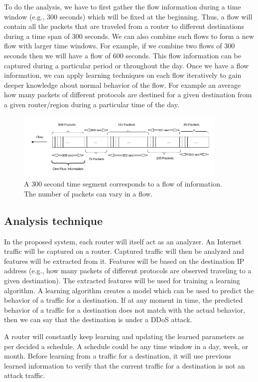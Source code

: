 \documentclass[12pt,oneside,a4paper]{article}
\begin{document}
To do the analysis, we have to first gather the flow information during a time window (e.g., 300 seconds) which will be fixed at the beginning. Thus, a flow will contain all the packets that are traveled from a router to different destinations during a time span of 300 seconds. We can also combine such flows to form a new flow with larger time windows. For example, if we combine two flows of 300 seconds then we will have a flow of 600 seconds. This flow information can be captured during a particular period or throughout the day. Once we have a flow information, we can apply learning techniques on each flow iteratively to gain deeper knowledge about normal behavior of the flow. For example an average how many packets of different protocols are destined for a given destination from a given router/region during a particular time of the day.

\begin{figure}[H]
\centering
\includegraphics[width=0.90\textwidth]{Data_Flow_Capture.png}
\caption{A 300 second time segment corresponds to a flow of information. The number of packets can vary in a flow.} \label{fig:flow}
\end{figure}

\subsection{Analysis technique}
In the proposed system, each router will itself act as an analyzer. An Internet traffic will be captured on a router. Captured traffic will then be analyzed and features will be extracted from it. Features will be based on the destination IP address (e.g., how many packets of different protocols are observed traveling to a given destination). The extracted features will be used for training a learning algorithm. A learning algorithm creates a model which can be used to predict the behavior of a traffic for a destination. If at any moment in time, the predicted behavior of a traffic for a destination does not match with the actual behavior, then we can say that the destination is under a DDoS attack.

A router will constantly keep learning and updating the learned parameters as per decided a schedule. A schedule could be any time window in a day, week, or month. Before learning from a traffic for a destination, it will use previous learned information to verify that the current traffic for a destination is not an attack traffic.
\end{document}
